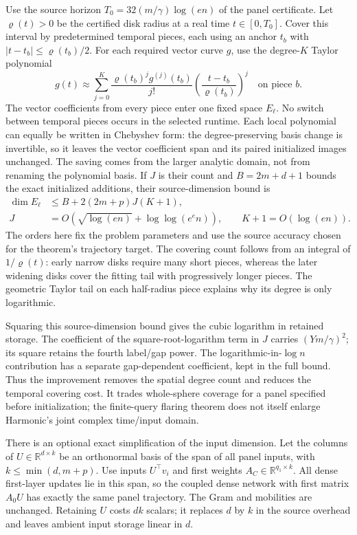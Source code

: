Use the source horizon $T_0=32(m/\gamma)\log(en)$ of the panel certificate.
Let $\varrho(t)>0$ be the certified disk radius at a real time
$t\in[0,T_0]$. Cover this interval by predetermined temporal pieces,
each using an anchor $t_b$ with
$|t-t_b|\le\varrho(t_b)/2$. For each required vector curve $g$, use
the degree-$K$ Taylor polynomial
\[
 g(t)\approx\sum_{j=0}^K
 \frac{\varrho(t_b)^j g^{(j)}(t_b)}{j!}
 \left(\frac{t-t_b}{\varrho(t_b)}\right)^j
 \quad\text{on piece }b.
\]
The vector coefficients from every piece enter one fixed space
$E_\ell$. No switch between temporal pieces occurs in the selected
runtime. Each local polynomial can equally be written in Chebyshev form:
the degree-preserving basis change is invertible, so it leaves the vector
coefficient span and its paired initialized images unchanged. The saving
comes from the larger analytic domain, not from renaming the polynomial basis.
If $J$ is their count and $B=2m+d+1$ bounds the exact initialized
additions, their source-dimension bound is
\begin{equation}
 \begin{aligned}
 \dim E_\ell&\le B+2(2m+p)J(K+1),\\
 J&=O\!\left(\sqrt{\log(en)}+\log\log(e^e n)\right),\qquad
 K+1=O(\log(en)).
 \end{aligned}
 \label{eq:methods-panel-source-count}
\end{equation}
The orders here fix the problem parameters and use the source accuracy
chosen for the theorem's trajectory target. The covering count follows
from an integral of $1/\varrho(t)$: early narrow disks require many short
pieces, whereas the later widening disks cover the fitting tail with
progressively longer pieces. The geometric Taylor tail on each half-radius
piece explains why its degree is only logarithmic.

Squaring this source-dimension bound gives the cubic logarithm in retained
storage. The coefficient of the square-root-logarithm term in $J$ carries
$(Ym/\gamma)^2$; its square retains the fourth label/gap power. The
logarithmic-in-$\log n$ contribution has a separate gap-dependent
coefficient, kept in the full bound. Thus the improvement removes the
spatial degree count and reduces the temporal covering cost. It trades
whole-sphere coverage for a panel specified before initialization; the
finite-query flaring theorem does not itself enlarge Harmonic's joint
complex time/input domain.

There is an optional exact simplification of the input dimension. Let
the columns of $U\in\mathbb R^{d\times k}$ be an orthonormal basis of
the span of all panel inputs, with $k\le\min(d,m+p)$. Use inputs
$U^\top v_i$ and first weights $A_C\in\mathbb R^{q_1\times k}$.
All dense first-layer updates lie in this span, so the coupled dense
network with first matrix $A_0U$ has exactly the same panel trajectory.
The Gram and mobilities are unchanged. Retaining $U$ costs $dk$ scalars;
it replaces $d$ by $k$ in the source overhead and leaves ambient input
storage linear in $d$.

